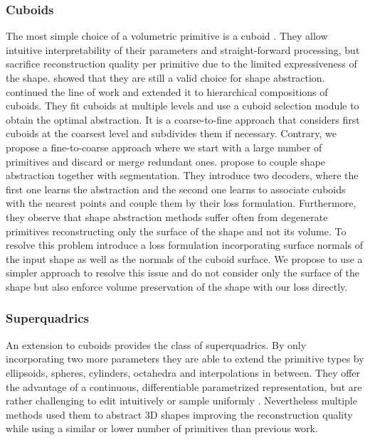 \subsubsection{Cuboids} 
The most simple choice of a volumetric primitive is a cuboid \cite{VP_Tulsiani, HCA_Sun, CAS_Yang}. 
They allow intuitive interpretability of their parameters and straight-forward processing, but sacrifice reconstruction quality per primitive due to the limited expressiveness of the shape.
\cite{VP_Tulsiani} showed that they are still a valid choice for shape abstraction.
\cite{HCA_Sun} continued the line of work and extended it to hierarchical compositions of cuboids. 
They fit cuboids at multiple levels and use a cuboid selection module to obtain the optimal abstraction.
It is a coarse-to-fine approach that considers first cuboids at the coarsest level and subdivides them if necessary.
Contrary, we propose a fine-to-coarse approach where we start with a large number of primitives and discard or merge redundant ones. 
\cite{CAS_Yang} propose to couple shape abstraction together with segmentation.
They introduce two decoders, where the first one learns the abstraction and the second one learns to associate cuboids with the nearest points and couple them by their loss formulation.
Furthermore, they observe that shape abstraction methods suffer often from degenerate primitives reconstructing only the surface of the shape and not its volume.
To resolve this problem \cite{CAS_Yang} introduce a loss formulation incorporating surface normals of the input shape as well as the normals of the cuboid surface.
We propose to use a simpler approach to resolve this issue and do not consider only the surface of the shape but also enforce volume preservation of the shape with our loss directly.

\subsubsection{Superquadrics} 
An extension to cuboids provides the class of superquadrics. 
By only incorporating two more parameters they are able to extend the primitive types by ellipsoids, spheres, cylinders, octahedra and interpolations in between. 
They offer the advantage of a continuous, differentiable parametrized representation, but are rather challenging to edit intuitively or sample uniformly \cite{EDS_Maurizio, SSQN_Ferreira}.
Nevertheless multiple methods \cite{SQR_Paschalidou, HSQ_Paschalidou, DSQ_Li} used them to abstract 3D shapes improving the reconstruction quality while using a similar or lower number of primitives than previous work.

